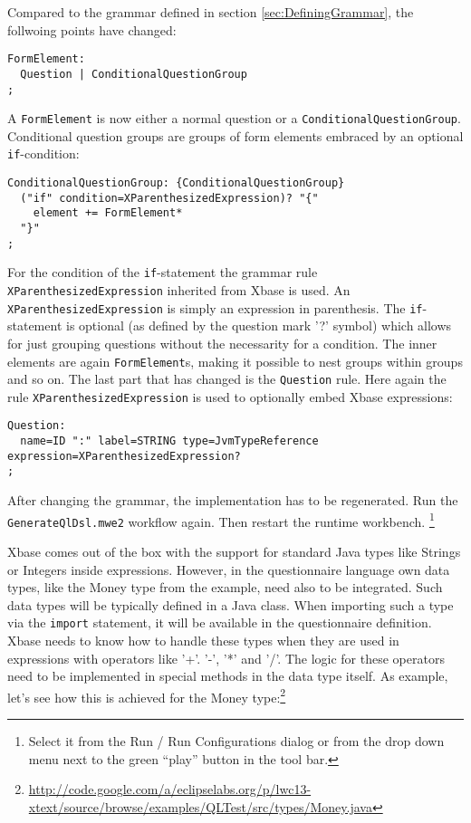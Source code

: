 Compared to the grammar defined in section \ref{sec:DefiningGrammar}, the follwoing points have changed:


\begin{lstlisting}[language=Xtext]
FormElement:
  Question | ConditionalQuestionGroup
;
\end{lstlisting}

A \texttt{FormElement} is now either a normal question or a \texttt{ConditionalQuestionGroup}. Conditional
question groups are groups of form elements embraced by an optional \texttt{if}-condition:

\begin{lstlisting}[language=Xtext]
ConditionalQuestionGroup: {ConditionalQuestionGroup}
  ("if" condition=XParenthesizedExpression)? "{"
    element += FormElement*
  "}"
;
\end{lstlisting}

For the condition of the \texttt{if}-statement the grammar rule \texttt{XParenthesizedExpression} 
inherited from Xbase is used. An \texttt{XParenthesizedExpression} is simply an expression in parenthesis.
The \texttt{if}-statement is optional (as defined by the question mark '?' symbol) which allows for just
grouping questions without the necessarity for a condition. The inner elements are again \texttt{FormElement}s,
making it possible to nest groups within groups and so on. The last part that has changed is the \texttt{Question}
rule. Here again the rule \texttt{XParenthesizedExpression} is used to optionally embed Xbase expressions:

\begin{lstlisting}[language=Xtext]
Question:
  name=ID ":" label=STRING type=JvmTypeReference expression=XParenthesizedExpression?
;
\end{lstlisting}

After changing the grammar, the implementation has to be regenerated. Run the
\texttt{GenerateQlDsl.mwe2} workflow again. Then restart the runtime workbench.
\footnote{Select it from the Run / Run Configurations dialog or from the drop
down menu next to the green ``play'' button in the tool bar.}

Xbase comes out of the box with the support for standard Java types like Strings or Integers inside expressions.
However, in the questionnaire language own data types, like the Money type from the example, need also to be
integrated. Such data types will be typically defined in a Java class. When importing such a type via the \texttt{import}
statement, it will be available in the questionnaire definition. Xbase needs to know how to handle
these types when they are used in expressions with operators like '+'. '-', '*' and '/'. The logic for these
operators need to be implemented in special methods in the data type itself. As example, let's see how this
is achieved for the Money
type:\footnote{\url{http://code.google.com/a/eclipselabs.org/p/lwc13-xtext/source/browse/examples/QLTest/src/types/Money.java}}


